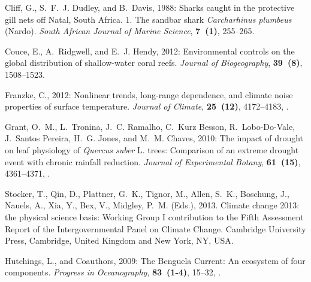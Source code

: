 \documentclass{ametsoc}
\begin{document}
\begin{thebibliography}{23}
Cliff, G., S.~F.~J. Dudley, and B.~Davis, 1988: {Sharks caught in the
  protective gill nets off Natal, South Africa. 1. The sandbar shark
  \textit{Carcharhinus plumbeus} (Nardo)}. \textit{South African Journal of Marine
  Science}, \textbf{7~(1)}, 255--265.

Couce, E., A.~Ridgwell, and E.~J. Hendy, 2012: {Environmental controls on the
  global distribution of shallow-water coral reefs}. \textit{Journal of
  Biogeography}, \textbf{39~(8)}, 1508--1523.

Franzke, C., 2012: {Nonlinear trends, long-range dependence, and climate noise
  properties of surface temperature}. \textit{Journal of Climate},
  \textbf{25~(12)}, 4172--4183, .

Grant, O.~M., L.~Tronina, J.~C. Ramalho, C.~{Kurz Besson}, R.~Lobo-Do-Vale,
  J.~{Santos Pereira}, H.~G. Jones, and M.~M. Chaves, 2010: {The impact of
  drought on leaf physiology of \textit{Quercus suber} L. trees: Comparison of an
  extreme drought event with chronic rainfall reduction}. \textit{Journal of
  Experimental Botany}, \textbf{61~(15)}, 4361--4371, .


Stocker, T., Qin, D., Plattner, G.~K., Tignor, M., Allen, S.~K., Boschung, J.,
  Nauels, A., Xia, Y., Bex, V., Midgley, P.~M. (Eds.), 2013. {Climate change
  2013: the physical science basis: Working Group I contribution to the Fifth
  Assessment Report of the Intergovernmental Panel on Climate Change}.
  Cambridge University Press, Cambridge, United Kingdom and New York, NY, USA. 

Hutchings, L., and Coauthors, 2009: {The Benguela Current: An ecosystem of four
  components}. \textit{Progress in Oceanography}, \textbf{83~(1-4)}, 15--32,
  .


\end{thebibliography}
\end{document}

